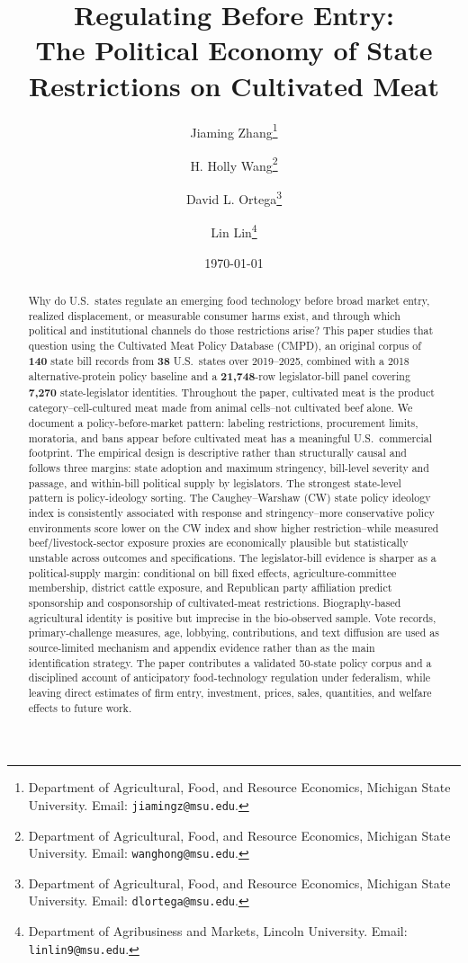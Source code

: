 \documentclass[12pt]{article}
\title{Regulating Before Entry:\\
The Political Economy of State Restrictions on Cultivated Meat}
\author{
Jiaming Zhang\thanks{Department of Agricultural, Food, and Resource Economics, Michigan State University. Email: \texttt{jiamingz@msu.edu}.}
\and H. Holly Wang\thanks{Department of Agricultural, Food, and Resource Economics, Michigan State University. Email: \texttt{wanghong@msu.edu}.}
\and David L. Ortega\thanks{Department of Agricultural, Food, and Resource Economics, Michigan State University. Email: \texttt{dlortega@msu.edu}.}
\and Lin Lin\thanks{Department of Agribusiness and Markets, Lincoln University. Email: \texttt{linlin9@msu.edu}.}
}
\date{\today}
\begin{document}
\maketitle

\begin{abstract}
Why do U.S.\ states regulate an emerging food technology before broad market entry, realized displacement, or measurable consumer harms exist, and through which political and institutional channels do those restrictions arise? This paper studies that question using the Cultivated Meat Policy Database (CMPD), an original corpus of \textbf{140} state bill records from \textbf{38} U.S.\ states over 2019--2025, combined with a 2018 alternative-protein policy baseline and a \textbf{21,748}-row legislator-bill panel covering \textbf{7,270} state-legislator identities. Throughout the paper, cultivated meat is the product category--cell-cultured meat made from animal cells--not cultivated beef alone. We document a policy-before-market pattern: labeling restrictions, procurement limits, moratoria, and bans appear before cultivated meat has a meaningful U.S.\ commercial footprint. The empirical design is descriptive rather than structurally causal and follows three margins: state adoption and maximum stringency, bill-level severity and passage, and within-bill political supply by legislators. The strongest state-level pattern is policy-ideology sorting. The Caughey--Warshaw (CW) state policy ideology index is consistently associated with response and stringency--more conservative policy environments score lower on the CW index and show higher restriction--while measured beef/livestock-sector exposure proxies are economically plausible but statistically unstable across outcomes and specifications. The legislator-bill evidence is sharper as a political-supply margin: conditional on bill fixed effects, agriculture-committee membership, district cattle exposure, and Republican party affiliation predict sponsorship and cosponsorship of cultivated-meat restrictions. Biography-based agricultural identity is positive but imprecise in the bio-observed sample. Vote records, primary-challenge measures, age, lobbying, contributions, and text diffusion are used as source-limited mechanism and appendix evidence rather than as the main identification strategy. The paper contributes a validated 50-state policy corpus and a disciplined account of anticipatory food-technology regulation under federalism, while leaving direct estimates of firm entry, investment, prices, sales, quantities, and welfare effects to future work.
\end{abstract}
\end{document}
